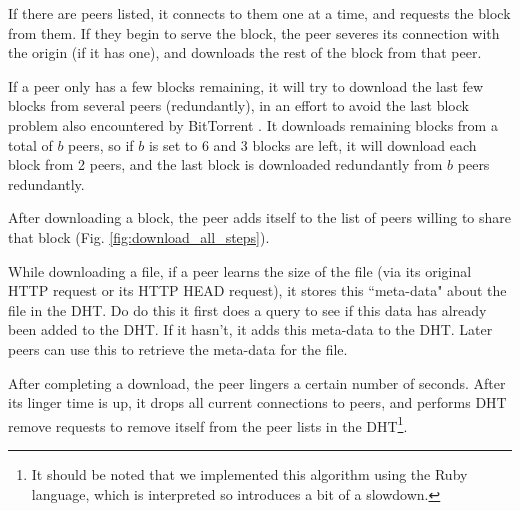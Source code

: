 If there are peers listed, it connects to them one at a time, and requests the block from them.  If they begin to serve the block, the peer severes its connection with the origin (if it has one),
and downloads the rest of the block from that peer.

If a peer only has a few blocks remaining, it will try to download the last few blocks from several peers (redundantly), in an effort to avoid the last block problem also
encountered by BitTorrent \cite{bram}.  It downloads remaining blocks from a total of $b$ peers, so if $b$ is set to 6 and 3 blocks are left, it will download each block from 2 peers, and the
last block is downloaded redundantly from $b$ peers redundantly.

After downloading a block, the peer adds itself to the list of peers willing to share that block (Fig. \ref{fig:download_all_steps}). 

While downloading a file, if a peer learns the size of the file (via its original HTTP request or its HTTP HEAD request), it stores this ``meta-data" about the file
in the DHT.  Do do this it first does a query to see if this data has already been added to the DHT.  If it hasn't, it adds this meta-data to the DHT.  Later peers
can use this to retrieve the meta-data for the file.

After completing a download, the peer lingers a certain number of seconds.  After its linger time is up, it drops all current connections to peers, and performs DHT remove requests to
remove itself from the peer lists in the DHT\footnote{It should be noted that we implemented this algorithm using the Ruby language, which is interpreted so introduces a bit of a slowdown.}.


